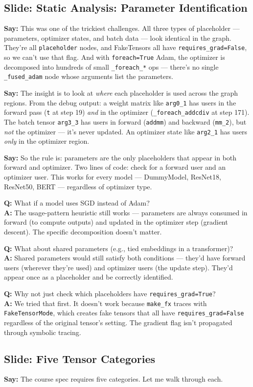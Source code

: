 \documentclass[11pt]{article}
\newcommand{\slide}[1]{\subsection*{Slide: #1}}
\newcommand{\say}[1]{\textbf{Say:} #1}
\newcommand{\qa}[2]{\textcolor{question}{\textbf{Q:} #1} \\ \textbf{A:} #2}
\begin{document}
\slide{Static Analysis: Parameter Identification}
\say{This was one of the trickiest challenges. All three types of placeholder --- parameters, optimizer states, and batch data --- look identical in the graph. They're all \texttt{placeholder} nodes, and FakeTensors all have \texttt{requires\_grad=False}, so we can't use that flag. And with \texttt{foreach=True} Adam, the optimizer is decomposed into hundreds of small \texttt{\_foreach\_*} ops --- there's no single \texttt{\_fused\_adam} node whose arguments list the parameters.}

\say{The insight is to look at \emph{where} each placeholder is used across the graph regions. From the debug output: a weight matrix like \texttt{arg0\_1} has users in the forward pass (\texttt{t} at step 19) \emph{and} in the optimizer (\texttt{\_foreach\_addcdiv} at step 171). The batch tensor \texttt{arg3\_3} has users in forward (\texttt{addmm}) and backward (\texttt{mm\_2}), but \emph{not} the optimizer --- it's never updated. An optimizer state like \texttt{arg2\_1} has users \emph{only} in the optimizer region.}

\say{So the rule is: parameters are the only placeholders that appear in both forward and optimizer. Two lines of code: check for a forward user and an optimizer user. This works for every model --- DummyModel, ResNet18, ResNet50, BERT --- regardless of optimizer type.}

\qa{What if a model uses SGD instead of Adam?}{The usage-pattern heuristic still works --- parameters are always consumed in forward (to compute outputs) and updated in the optimizer step (gradient descent). The specific decomposition doesn't matter.}

\qa{What about shared parameters (e.g., tied embeddings in a transformer)?}{Shared parameters would still satisfy both conditions --- they'd have forward users (wherever they're used) and optimizer users (the update step). They'd appear once as a placeholder and be correctly identified.}

\qa{Why not just check which placeholders have \texttt{requires\_grad=True}?}{We tried that first. It doesn't work because \texttt{make\_fx} traces with \texttt{FakeTensorMode}, which creates fake tensors that all have \texttt{requires\_grad=False} regardless of the original tensor's setting. The gradient flag isn't propagated through symbolic tracing.}

\slide{Five Tensor Categories}
\say{The course spec requires five categories. Let me walk through each.}
\end{document}
